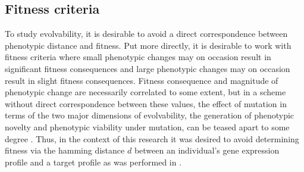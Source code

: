 \subsection{Fitness criteria} \label{sec:fitness}
To study evolvability, it is desirable to avoid a direct correspondence between phenotypic distance and fitness.
Put more directly, it is desirable to work with fitness criteria where small phenotypic changes may on occasion result in significant fitness consequences and large phenotypic changes may on occasion result in slight fitness consequences.
Fitness consequence and magnitude of phenotypic change are necessarily correlated to some extent, but in a scheme without direct correspondence between these values, the effect of mutation in terms of the two major dimensions of evolvability, the generation of phenotypic novelty and phenotypic viability under mutation, can be teased apart to some degree \cite{Tarapore2015EvolvabilityBenchmarks}.
Thus, in the context of this research it was desired to avoid determining fitness via the hamming distance $d$ between an individual's gene expression profile and a target profile as was performed in \cite{Wilder2015ReconcilingEvolvability}.

